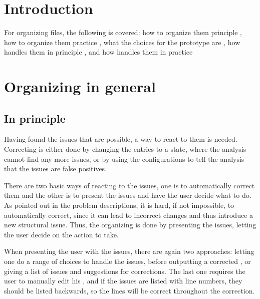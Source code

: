 
\section{Introduction}

For organizing {\bibtex} files, the following is covered: how to
organize them principle , how to
organize them practice , what the
choices for the prototype {\orangutan} are
, how {\orangutan} handles them
in principle , and how
{\orangutan} handles them in practice


\section{Organizing in general}

\subsection{In principle}
\label{sec:organizing_principle}

Having found the issues that are possible, a way to react to them is
needed.  Correcting is either done by changing the entries to a state,
where the analysis cannot find any more issues, or by using the
configurations to tell the analysis that the issues are false
positives.

There are two basic ways of reacting to the issues, one is to
automatically correct them and the other is to present the issues and
have the user decide what to do.  As pointed out in the problem
descriptions, it is hard, if not impossible, to automatically correct,
since it can lead to incorrect changes and thus introduce a new
structural issue.  Thus, the organizing is done by presenting the
issues, letting the user decide on the action to take.

When presenting the user with the issues, there are again two
approaches: letting one do a range of choices to handle the issues,
before outputting a corrected , or giving a list of issues
and suggestions for corrections.  The last one requires the user to
manually edit his , and if the issues are listed with line
numbers, they should be listed backwards, so the lines will be correct
throughout the correction.

